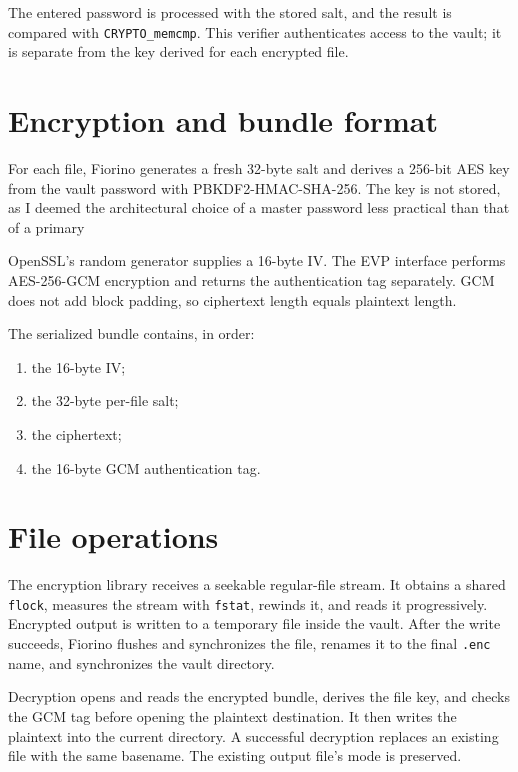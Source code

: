 The entered password is processed with the stored salt, and the result is
compared with \texttt{CRYPTO\_memcmp}. This verifier authenticates access to
the vault; it is separate from the key derived for each encrypted file.

\section{Encryption and bundle format}

For each file, Fiorino generates a fresh 32-byte salt and derives a 256-bit
AES key from the vault password with PBKDF2-HMAC-SHA-256. The key is not
stored, as I deemed the architectural choice of a master password less practical
than that of a primary 

OpenSSL's random generator supplies a 16-byte IV. The EVP interface
performs AES-256-GCM encryption and returns the authentication tag separately.
GCM does not add block padding, so ciphertext length equals plaintext length.

The serialized bundle contains, in order:

\begin{enumerate}
    \item the 16-byte IV;
    \item the 32-byte per-file salt;
    \item the ciphertext;
    \item the 16-byte GCM authentication tag.
\end{enumerate}

\section{File operations}

The encryption library receives a seekable regular-file stream. It obtains a
shared \texttt{flock}, measures the stream with \texttt{fstat}, rewinds it,
and reads it progressively. Encrypted output is written to a temporary file
inside the vault. After the write succeeds, Fiorino flushes and synchronizes
the file, renames it to the final \texttt{.enc} name, and synchronizes the
vault directory.

Decryption opens and reads the encrypted bundle, derives the file key, and
checks the GCM tag before opening the plaintext destination. It then writes
the plaintext into the current directory. A successful decryption replaces
an existing file with the same basename. The existing output file's mode is
preserved.

